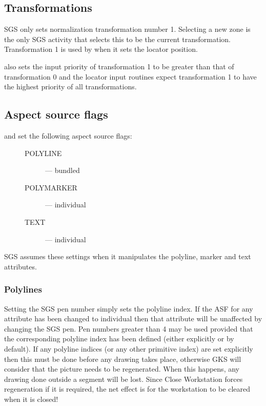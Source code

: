 \documentclass[11pt]{starlink}
\begin{document}
\subsection* {Transformations}

SGS only sets normalization transformation number 1.
Selecting a new zone is the only SGS activity that selects this to be the
current transformation.
Transformation 1 is used by
 when it sets the locator position.

 also sets the input priority of transformation 1 to be greater than
that of transformation 0 and the locator input routines expect transformation
1 to have the highest priority of all transformations.

\subsection* {Aspect source flags}

 and 
set the following aspect source flags:
\begin{description}
\item[\mbox{}]\mbox{}
\begin{description}
\item [POLYLINE] --- bundled
\item [POLYMARKER] --- individual
\item [TEXT] --- individual
\end{description}
\end{description}
SGS assumes these settings when it manipulates the polyline, marker and text
attributes.

\subsubsection* {Polylines}

Setting the SGS pen number simply sets the polyline index.
If the ASF for any attribute has been changed to individual then that attribute
will be unaffected by changing the SGS pen.
Pen numbers greater than 4 may be used provided that the corresponding polyline
index has been defined (either explicitly or by default).
If any polyline indices (or any other primitive index) are set explicitly then
this must be done before any drawing takes place, otherwise GKS will consider
that the picture needs to be regenerated.
When this happens, any drawing done outside a segment will be lost.
Since Close Workstation forces regeneration if it is required, the net effect is
for the workstation to be cleared when it is closed!
\end{document}
